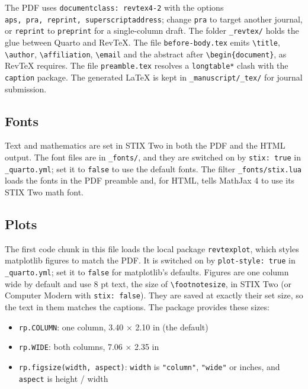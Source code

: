 \documentclass[
  aps,
  pra,
  reprint,
  superscriptaddress]{revtex4-2}
\providecommand{\tightlist}{%
  \setlength{\itemsep}{0pt}\setlength{\parskip}{0pt}}
\begin{document}
The PDF uses \texttt{documentclass:\ revtex4-2} with the options
\texttt{aps,\ pra,\ reprint,\ superscriptaddress}; change \texttt{pra}
to target another journal, or \texttt{reprint} to \texttt{preprint} for
a single-column draft. The folder \texttt{\_revtex/} holds the glue
between Quarto and RevTeX. The file \texttt{before-body.tex} emits
\texttt{\textbackslash{}title}, \texttt{\textbackslash{}author},
\texttt{\textbackslash{}affiliation}, \texttt{\textbackslash{}email} and
the abstract after \texttt{\textbackslash{}begin\{document\}}, as RevTeX
requires. The file \texttt{preamble.tex} resolves a \texttt{longtable*}
clash with the \texttt{caption} package. The generated LaTeX is kept in
\texttt{\_manuscript/\_tex/} for journal submission.

\subsection{Fonts}\label{fonts}

Text and mathematics are set in STIX Two in both the PDF and the HTML
output. The font files are in \texttt{\_fonts/}, and they are switched
on by \texttt{stix:\ true} in \texttt{\_quarto.yml}; set it to
\texttt{false} to use the default fonts. The filter
\texttt{\_fonts/stix.lua} loads the fonts in the PDF preamble and, for
HTML, tells MathJax 4 to use its STIX Two math font.

\subsection{Plots}\label{sec-plots}

The first code chunk in this file loads the local package
\texttt{revtexplot}, which styles matplotlib figures to match the PDF.
It is switched on by \texttt{plot-style:\ true} in
\texttt{\_quarto.yml}; set it to \texttt{false} for matplotlib's
defaults. Figures are one column wide by default and use 8 pt text, the
size of \texttt{\textbackslash{}footnotesize}, in STIX Two (or Computer
Modern with \texttt{stix:\ false}). They are saved at exactly their set
size, so the text in them matches the captions. The package provides
these sizes:

\begin{itemize}
\tightlist
\item
  \texttt{rp.COLUMN}: one column, 3.40 × 2.10 in (the default)
\item
  \texttt{rp.WIDE}: both columns, 7.06 × 2.35 in
\item
  \texttt{rp.figsize(width,\ aspect)}: \texttt{width} is
  \texttt{"column"}, \texttt{"wide"} or inches, and \texttt{aspect} is
  height / width
\end{itemize}
\end{document}

